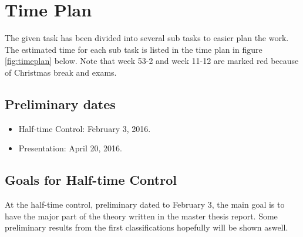 \documentclass{article}
\begin{document}
\section{Time Plan}
The given task has been divided into several sub tasks to easier plan the work. The estimated time for each sub task is listed in the time plan in figure \ref{fig:timeplan} below.
Note that week 53-2 and week 11-12 are marked red because of Christmas break and exams.


\subsection{Preliminary dates}
\begin{itemize}
\item Half-time Control: February 3, 2016.
\item Presentation: April 20, 2016.
\end{itemize}

\subsection{Goals for Half-time Control}
At the half-time control, preliminary dated to February 3, the main goal is to have the major part of the theory written in the master thesis report. Some preliminary results from the first classifications hopefully will be shown aswell.
\end{document}
